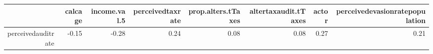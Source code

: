 \begin{table}[ht]
\centering
\begin{tabular}{rrrrrrrr}
  \hline
 & calcage & income.val.5 & perceivedtaxrate & prop.alters.tTaxes & altertaxaudit.tTaxes & actor & perceivedevasionratepopulation \\ 
  \hline
perceivedauditrate & -0.15 & -0.28 & 0.24 & 0.08 & 0.08 & 0.27 & 0.21 \\ 
   \hline
\end{tabular}
\end{table}
